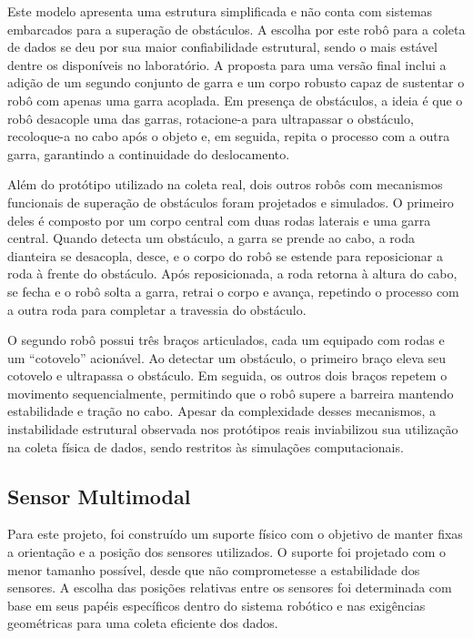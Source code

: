 Este modelo apresenta uma estrutura simplificada e não conta com sistemas embarcados para a superação de obstáculos. A escolha por este robô para a coleta de dados se deu por sua maior confiabilidade estrutural, sendo o mais estável dentre os disponíveis no laboratório. A proposta para uma versão final inclui a adição de um segundo conjunto de garra e um corpo robusto capaz de sustentar o robô com apenas uma garra acoplada. Em presença de obstáculos, a ideia é que o robô desacople uma das garras, rotacione-a para ultrapassar o obstáculo, recoloque-a no cabo após o objeto e, em seguida, repita o processo com a outra garra, garantindo a continuidade do deslocamento.

Além do protótipo utilizado na coleta real, dois outros robôs com mecanismos funcionais de superação de obstáculos foram projetados e simulados. O primeiro deles é composto por um corpo central com duas rodas laterais e uma garra central. Quando detecta um obstáculo, a garra se prende ao cabo, a roda dianteira se desacopla, desce, e o corpo do robô se estende para reposicionar a roda à frente do obstáculo. Após reposicionada, a roda retorna à altura do cabo, se fecha e o robô solta a garra, retrai o corpo e avança, repetindo o processo com a outra roda para completar a travessia do obstáculo.

O segundo robô possui três braços articulados, cada um equipado com rodas e um “cotovelo” acionável. Ao detectar um obstáculo, o primeiro braço eleva seu cotovelo e ultrapassa o obstáculo. Em seguida, os outros dois braços repetem o movimento sequencialmente, permitindo que o robô supere a barreira mantendo estabilidade e tração no cabo. Apesar da complexidade desses mecanismos, a instabilidade estrutural observada nos protótipos reais inviabilizou sua utilização na coleta física de dados, sendo restritos às simulações computacionais.

\subsection{Sensor Multimodal}

Para este projeto, foi construído um suporte físico com o objetivo de manter fixas a orientação e a posição dos sensores utilizados. O suporte foi projetado com o menor tamanho possível, desde que não comprometesse a estabilidade dos sensores. A escolha das posições relativas entre os sensores foi determinada com base em seus papéis específicos dentro do sistema robótico e nas exigências geométricas para uma coleta eficiente dos dados.

